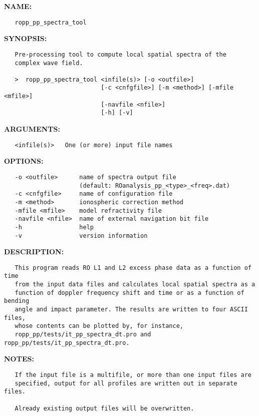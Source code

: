 \label{ch:robo91}
\label{ch:Programs_ropp_pp_spectra_tool}
\textbf{NAME:}\hspace{0.08in}\begin{Verbatim}
   ropp_pp_spectra_tool
\end{Verbatim}
\textbf{SYNOPSIS:}\hspace{0.08in}\begin{Verbatim}
   Pre-processing tool to compute local spatial spectra of the
   complex wave field.

   >  ropp_pp_spectra_tool <infile(s)> [-o <outfile>]
                           [-c <cnfgfile>] [-m <method>] [-mfile <mfile>]
                           [-navfile <nfile>]
                           [-h] [-v]
\end{Verbatim}
\textbf{ARGUMENTS:}\hspace{0.08in}\begin{Verbatim}
   <infile(s)>   One (or more) input file names
\end{Verbatim}
\textbf{OPTIONS:}\hspace{0.08in}\begin{Verbatim}
   -o <outfile>      name of spectra output file
                     (default: ROanalysis_pp_<type>_<freq>.dat)
   -c <cnfgfile>     name of configuration file
   -m <method>       ionospheric correction method
   -mfile <mfile>    model refractivity file
   -navfile <nfile>  name of external navigation bit file
   -h                help
   -v                version information
\end{Verbatim}
\textbf{DESCRIPTION:}\hspace{0.08in}\begin{Verbatim}
   This program reads RO L1 and L2 excess phase data as a function of time
   from the input data files and calculates local spatial spectra as a
   function of doppler frequency shift and time or as a function of bending
   angle and impact parameter. The results are written to four ASCII files, 
   whose contents can be plotted by, for instance, 
   ropp_pp/tests/it_pp_spectra_dt.pro and ropp_pp/tests/it_pp_spectra_dt.pro.
\end{Verbatim}
\textbf{NOTES:}\hspace{0.08in}\begin{Verbatim}
   If the input file is a multifile, or more than one input files are
   specified, output for all profiles are written out in separate files.

   Already existing output files will be overwritten.
\end{Verbatim}
